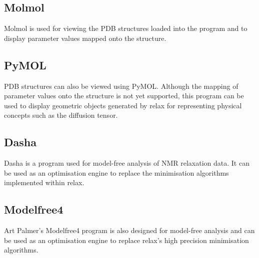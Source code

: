 \subsection{Molmol}

Molmol is used for viewing the PDB structures loaded into the program and to display parameter values mapped onto the structure.


\subsection{PyMOL}

PDB structures can also be viewed using PyMOL.  Although the mapping of parameter values onto the structure is not yet supported, this program can be used to display geometric objects generated by relax for representing physical concepts such as the diffusion tensor.


\subsection{Dasha}

Dasha is a program used for model-free analysis of NMR relaxation data.  It can be used as an optimisation engine to replace the minimisation algorithms implemented within relax.


\subsection{Modelfree4}

Art Palmer's Modelfree4 program is also designed for model-free analysis and can be used as an optimisation engine to replace relax's high precision minimisation algorithms.
